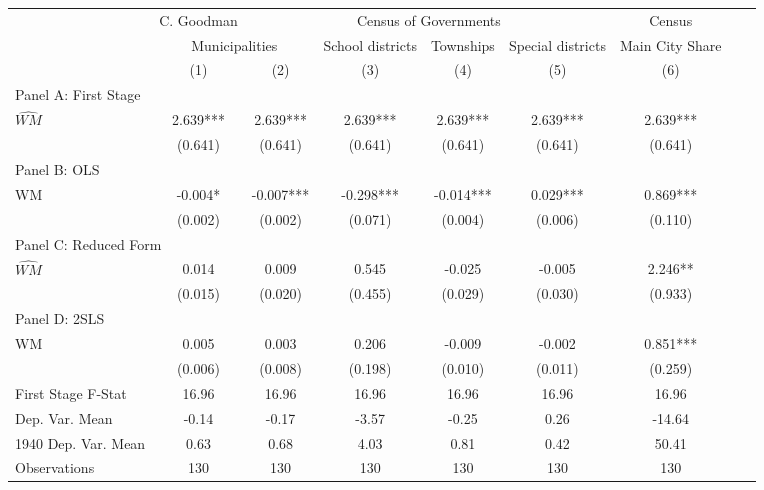 \begin{tabular}{l*{8}{c}} \toprule
&\multicolumn{1}{c}{C. Goodman}&\multicolumn{4}{c}{Census of Governments}&\multicolumn{1}{c}{Census}\\\cmidrule(lr){2-2}\cmidrule(lr){3-6}\cmidrule(lr){7-7}
&\multicolumn{2}{c}{Municipalities}&\multicolumn{1}{c}{School districts}&\multicolumn{1}{c}{Townships}&\multicolumn{1}{c}{Special districts}&\multicolumn{1}{c}{Main City Share}\\\cmidrule(lr){2-3}\cmidrule(lr){4-6}\cmidrule(lr){7-7}
&\multicolumn{1}{c}{(1)}&\multicolumn{1}{c}{(2)}&\multicolumn{1}{c}{(3)}&\multicolumn{1}{c}{(4)}&\multicolumn{1}{c}{(5)}&\multicolumn{1}{c}{(6)}\\
\cmidrule(lr){1-7}
\multicolumn{6}{l}{Panel A: First Stage}\\
\cmidrule(lr){1-7}
$\widehat{WM}$  &    2.639***&    2.639***&    2.639***&    2.639***&    2.639***&    2.639***\\
                &  (0.641)   &  (0.641)   &  (0.641)   &  (0.641)   &  (0.641)   &  (0.641)   \\
\cmidrule(lr){1-7}
\multicolumn{6}{l}{Panel B: OLS}\\
\cmidrule(lr){1-7}
WM              &   -0.004*  &   -0.007***&   -0.298***&   -0.014***&    0.029***&    0.869***\\
                &  (0.002)   &  (0.002)   &  (0.071)   &  (0.004)   &  (0.006)   &  (0.110)   \\
\cmidrule(lr){1-7}
\multicolumn{6}{l}{Panel C: Reduced Form}\\
\cmidrule(lr){1-7}
$\widehat{WM}$  &    0.014   &    0.009   &    0.545   &   -0.025   &   -0.005   &    2.246** \\
                &  (0.015)   &  (0.020)   &  (0.455)   &  (0.029)   &  (0.030)   &  (0.933)   \\
\cmidrule(lr){1-7}
\multicolumn{6}{l}{Panel D: 2SLS}\\
\cmidrule(lr){1-7}
WM              &    0.005   &    0.003   &    0.206   &   -0.009   &   -0.002   &    0.851***\\
                &  (0.006)   &  (0.008)   &  (0.198)   &  (0.010)   &  (0.011)   &  (0.259)   \\
\midrule
First Stage F-Stat&    16.96   &    16.96   &    16.96   &    16.96   &    16.96   &    16.96   \\
Dep. Var. Mean  &    -0.14   &    -0.17   &    -3.57   &    -0.25   &     0.26   &   -14.64   \\
1940 Dep. Var. Mean&     0.63   &     0.68   &     4.03   &     0.81   &     0.42   &    50.41   \\
Observations    &      130   &      130   &      130   &      130   &      130   &      130   \\
       \bottomrule \end{tabular}
